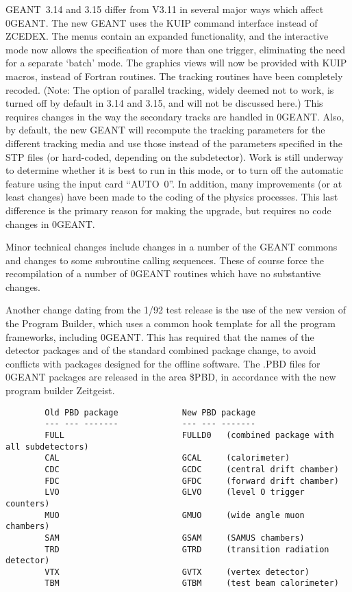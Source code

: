 GEANT~3.14 and 3.15 differ from V3.11 in several major ways which affect
\D0GEANT. The new GEANT uses the KUIP command interface instead of ZCEDEX.  The
menus contain an expanded functionality, and the interactive mode now
allows the specification of more than one trigger, eliminating the need
for a separate `batch' mode.  The graphics views will now be provided with
KUIP macros, instead of Fortran routines.  The tracking routines have been
completely recoded.  (Note: The option of parallel tracking, widely deemed
not to work, is turned off by default in 3.14 and 3.15, and will not be
discussed here.) This requires changes in the way the secondary tracks are
handled in \D0GEANT.  Also, by default, the new GEANT will recompute the
tracking parameters for the different tracking media and use those instead of
the parameters specified in the STP files (or hard-coded, depending on the 
subdetector). Work is still underway to determine whether it is best to run in
this mode, or to turn off the automatic feature using the input card
``AUTO~0''. In addition, many improvements (or at least changes) have been made
to the coding of the physics processes.  This last difference is the primary
reason for making the upgrade, but requires no code changes in \D0GEANT.

Minor technical changes include changes in a number of the GEANT commons
and changes to some subroutine calling sequences.  These of course force the
recompilation of a number of \D0GEANT routines which have no substantive
changes.

Another change dating from the 1/92 test release is the use of the new
version of the  Program Builder, which uses a common hook template for all
the  program frameworks, including \D0GEANT.  This has required that
the names of the detector packages and of the standard combined package change,
to avoid conflicts with packages designed for the offline software. The .PBD
files for \D0GEANT packages are released in the area \$PBD, in accordance
with the new program builder Zeitgeist.

\begin{verbatim}
        Old PBD package             New PBD package
        --- --- -------             --- --- -------
        FULL                        FULLD0   (combined package with all subdetectors)
        CAL                         GCAL     (calorimeter)
        CDC                         GCDC     (central drift chamber)
        FDC                         GFDC     (forward drift chamber)
        LVO                         GLVO     (level O trigger counters)
        MUO                         GMUO     (wide angle muon chambers)
        SAM                         GSAM     (SAMUS chambers)
        TRD                         GTRD     (transition radiation detector)
        VTX                         GVTX     (vertex detector)
        TBM                         GTBM     (test beam calorimeter)
\end{verbatim}

